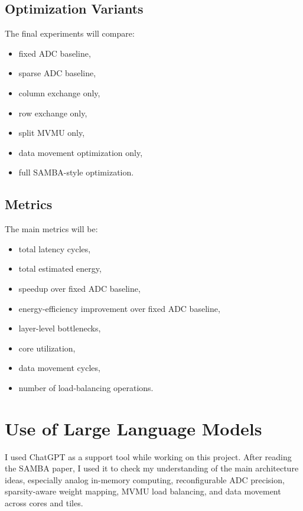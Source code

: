 \documentclass[11pt]{article}
\begin{document}
\subsection{Optimization Variants}

The final experiments will compare:

\begin{itemize}
    \item fixed ADC baseline,
    \item sparse ADC baseline,
    \item column exchange only,
    \item row exchange only,
    \item split MVMU only,
    \item data movement optimization only,
    \item full SAMBA-style optimization.
\end{itemize}

\subsection{Metrics}

The main metrics will be:

\begin{itemize}
    \item total latency cycles,
    \item total estimated energy,
    \item speedup over fixed ADC baseline,
    \item energy-efficiency improvement over fixed ADC baseline,
    \item layer-level bottlenecks,
    \item core utilization,
    \item data movement cycles,
    \item number of load-balancing operations.
\end{itemize}

\section{Use of Large Language Models}

I used ChatGPT as a support tool while working on this project. After reading the SAMBA paper, I used it to check my understanding of the main architecture ideas, especially analog in-memory computing, reconfigurable ADC precision, sparsity-aware weight mapping, MVMU load balancing, and data movement across cores and tiles.
\end{document}
